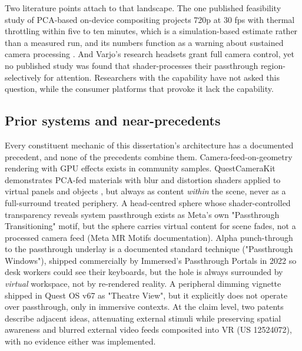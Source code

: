Two literature points attach to that landscape. The one published feasibility study of PCA-based
on-device compositing projects 720p at 30 fps with thermal throttling within five to ten minutes,
which is a simulation-based estimate rather than a measured run, and its numbers function as a
warning about sustained camera processing \citep{laghari2025}. And Varjo's research headsets grant
full camera control, yet no published study was found that shader-processes their passthrough
region-selectively for attention. Researchers with the capability have not asked this question, while
the consumer platforms that provoke it lack the capability.

\subsection{Prior systems and near-precedents}

Every constituent mechanic of this dissertation's architecture has a documented precedent, and none
of the precedents combine them. Camera-feed-on-geometry rendering with GPU effects exists in
community samples. QuestCameraKit demonstrates PCA-fed materials with blur and distortion shaders
applied to virtual panels and objects \citep{coviello2025}, but always as content \textit{within}
the scene, never as a full-surround treated periphery. A head-centred sphere whose shader-controlled
transparency reveals system passthrough exists as Meta's own "Passthrough Transitioning" motif, but
the sphere carries virtual content for scene fades, not a processed camera feed (Meta MR Motifs
documentation). Alpha punch-through to the passthrough underlay is a documented standard technique
("Passthrough Windows"), shipped commercially by Immersed's Passthrough Portals in 2022 so desk
workers could see their keyboards, but the hole is always surrounded by \textit{virtual} workspace, not by
re-rendered reality. A peripheral dimming vignette shipped in Quest OS v67 as "Theatre View", but it
explicitly does not operate over passthrough, only in immersive contexts. At the claim level, two
patents describe adjacent ideas, attenuating external stimuli while preserving spatial awareness
\citep{patents} and blurred external video feeds composited into VR (US 12524072), with no evidence
either was implemented.

